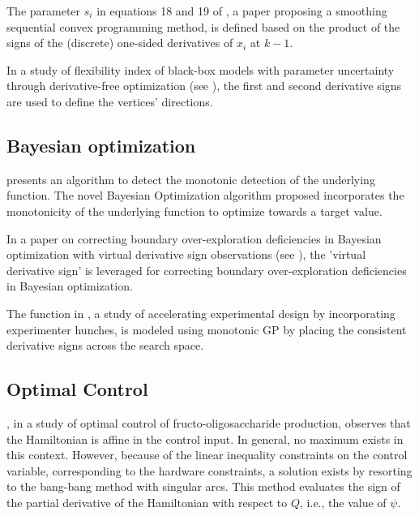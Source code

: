 \documentclass[11pt]{book}
\begin{document}
The parameter $s_{i}$ in equations 18 and 19 of \cite{lahmdani2021smoothing}, a paper proposing a smoothing sequential convex programming
method,
is defined based on the product of the signs of the (discrete) one-sided
derivatives of $x_{i}$ at $k-1$.

In a study of flexibility index of black-box models with parameter uncertainty through
derivative-free optimization (see \cite{zhao2021flexibility}), the first and second derivative signs are used to define the vertices' directions.


\subsection{Bayesian optimization}

\cite{li2017bayesian} presents an algorithm to detect the monotonic detection of the underlying function. The novel Bayesian Optimization algorithm proposed incorporates the monotonicity of the underlying function to optimize
towards a target value.

In a paper on correcting boundary over-exploration deficiencies in Bayesian optimization
with virtual derivative sign observations (see \cite{siivola2018correcting}), the 'virtual derivative sign' is leveraged
for correcting boundary over-exploration deficiencies in Bayesian
optimization.

The function in \cite{li2019accelerating}, a study of accelerating experimental design by incorporating experimenter hunches, is modeled using monotonic
GP by placing the consistent derivative signs across the search space.


\subsection{Optimal Control}

\cite{schorsch2018identification}, in a study of optimal control of fructo-oligosaccharide production, observes that the Hamiltonian is affine in the control input. In general, no maximum exists
in this context. However, because of the linear inequality constraints
on the control variable, corresponding to the hardware constraints,
a solution exists by resorting to the bang-bang method with singular
arcs. This method evaluates the sign of the partial derivative of
the Hamiltonian with respect to $Q$, i.e., the value of $\psi$.
\end{document}
